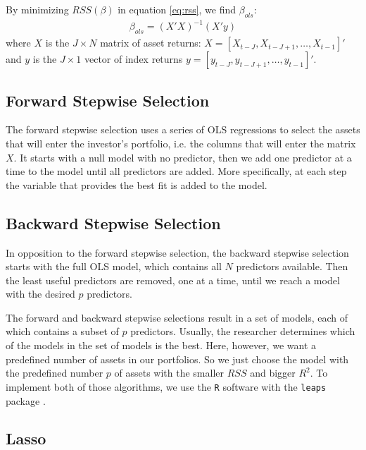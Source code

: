 \documentclass[12pt,oneside,a4paper]{memoir}
\begin{document}
By minimizing $RSS(\beta)$ in equation \eqref{eq:rss}, we find $\beta_{ols}$:
\begin{align} 
	\label{eq:bols}
	\beta_{ols} = (X'X)^{-1}(X'y)
\end{align}
where $X$ is the $J \times N$ matrix of asset returns: $X = [X_{t-J}, X_{t-J+1}, \dots , X_{t-1}]'$ and $y$ is the $J\times 1$ vector of index returns $y = [y_{t-J}, y_{t-J+1}, \dots , y_{t-1}]'$.

\subsection{Forward Stepwise Selection}

The forward stepwise selection uses a series of OLS regressions to select the assets that will enter the investor's portfolio, i.e. the columns that will enter the matrix $X$.
It starts with a null model with no predictor, then we add one predictor at a time to the model until all predictors are added.
More specifically, at each step the variable that provides the best fit is added to the model.

\subsection{Backward Stepwise Selection}

In opposition to the forward stepwise selection, the backward stepwise selection starts with the full OLS model, which contains all $N$ predictors available.
Then the least useful predictors are removed, one at a time, until we reach a model with the desired $p$ predictors.

The forward and backward stepwise selections result in a set of models, each of which contains a subset of $p$ predictors.
Usually, the researcher determines which of the models in the set of models is the best.
Here, however, we want a predefined number of assets in our portfolios.
So we just choose the model with the predefined number $p$ of assets with the smaller $RSS$ and bigger $R^2$.
To implement both of those algorithms, we  use the \texttt{R} software \cite{R} with the \texttt{leaps} package \cite{R:leaps}.

\subsection{Lasso}
\end{document}
